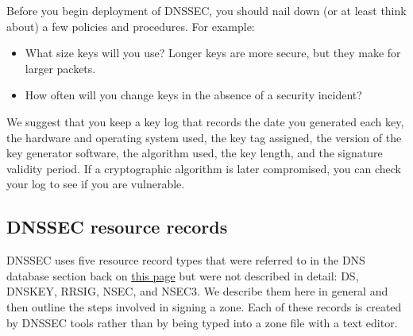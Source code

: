Before you begin deployment of DNSSEC, you should nail down (or at least
think about) a few policies and procedures. For example:

\begin{itemize}
\tightlist
\item
  What size keys will you use? Longer keys are more secure, but they
  make for larger packets.
\item
  How often will you change keys in the absence of a security incident?
\end{itemize}

We suggest that you keep a key log that records the date you generated
each key, the hardware and operating system used, the key tag assigned,
the version of the key generator software, the algorithm used, the key
length, and the signature validity period. If a cryptographic algorithm
is later compromised, you can check your log to see if you are
vulnerable.

\protect\hypertarget{part0024_split_061.html}{}{}

\hypertarget{part0024_split_061.htmlux5cux23_idContainer1069}{}
\hypertarget{part0024_split_061.htmlux5cux23calibre_pb_60}{%
\subsection[DNSSEC resource
records]{\texorpdfstring{\protect\hypertarget{part0024_split_061.htmlux5cux23_idTextAnchor940}{}{}DNSSEC
resource
records}{DNSSEC resource records}}\label{part0024_split_061.htmlux5cux23calibre_pb_60}}

DNSSEC uses five resource record types that were referred to in the DNS
database section back on
\protect\hyperlink{part0024_split_019.htmlux5cux23_idTextAnchor865}{this
page} but were not described in detail:
\protect\hypertarget{part0024_split_061.htmlux5cux23_idIndexMarker2252}{}{}\protect\hypertarget{part0024_split_061.htmlux5cux23_idIndexMarker2253}{}{}DS,
\protect\hypertarget{part0024_split_061.htmlux5cux23_idIndexMarker2254}{}{}\protect\hypertarget{part0024_split_061.htmlux5cux23_idIndexMarker2255}{}{}DNSKEY,
\protect\hypertarget{part0024_split_061.htmlux5cux23_idIndexMarker2256}{}{}\protect\hypertarget{part0024_split_061.htmlux5cux23_idIndexMarker2257}{}{}RRSIG,
\protect\hypertarget{part0024_split_061.htmlux5cux23_idIndexMarker2258}{}{}\protect\hypertarget{part0024_split_061.htmlux5cux23_idIndexMarker2259}{}{}NSEC,
and
\protect\hypertarget{part0024_split_061.htmlux5cux23_idIndexMarker2260}{}{}\protect\hypertarget{part0024_split_061.htmlux5cux23_idIndexMarker2261}{}{}NSEC3.
We describe them here in general and then outline the steps involved in
signing a zone. Each of these records is created by DNSSEC tools rather
than by being typed into a zone file with a text editor.

